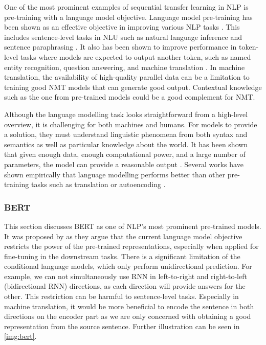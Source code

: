 One of the most prominent examples of sequential transfer learning in NLP is pre-training with a language model objective. Language model pre-training has been shown as an effective objective in improving various NLP tasks . This includes sentence-level tasks in NLU such as natural language inference  and sentence paraphrasing . It also has been shown to improve performance in token-level tasks where models are expected to output another token, such as named entity recognition, question answering, and machine translation . In machine translation, the availability of high-quality parallel data can be a limitation to training good NMT models that can generate good output. Contextual knowledge such as the one from pre-trained models could be a good complement for NMT.

Although the language modelling task looks straightforward from a high-level overview, it is challenging for both machines and humans. For models to provide a solution, they must understand linguistic phenomena from both syntax and semantics as well as particular knowledge about the world. It has been shown that given enough data, enough computational power, and a large number of parameters, the model can provide a reasonable output . Several works have shown empirically that language modelling performs better than other pre-training tasks such as translation or autoencoding .

\subsubsection{BERT}
This section discusses BERT as one of NLP's most prominent pre-trained models. It was proposed by  as they argue that the current language model objective restricts the power of the pre-trained representations, especially when applied for fine-tuning in the downstream tasks. There is a significant limitation of the conditional language models, which only perform unidirectional prediction. For example, we can not simultaneously use RNN in left-to-right and right-to-left (bidirectional RNN) directions, as each direction will provide answers for the other. This restriction can be harmful to sentence-level tasks. Especially in machine translation, it would be more beneficial to encode the sentence in both directions on the encoder part as we are only concerned with obtaining a good representation from the source sentence. Further illustration can be seen in \cref{img:bert}.

